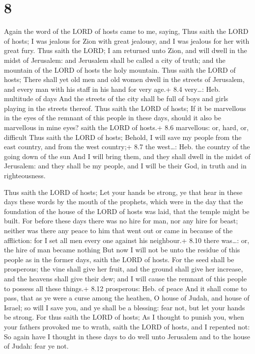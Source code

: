 \hypertarget{section-7}{%
\section{8}\label{section-7}}

 Again the word of the LORD of hosts came to me, saying,
 Thus saith the LORD of hosts; I was jealous for Zion with
great jealousy, and I was jealous for her with great fury. 
Thus saith the LORD; I am returned unto Zion, and will dwell in the
midst of Jerusalem: and Jerusalem shall be called a city of truth; and
the mountain of the LORD of hosts the holy mountain.  Thus
saith the LORD of hosts; There shall yet old men and old women dwell in
the streets of Jerusalem, and every man with his staff in his hand for
very age.+ 8.4 very\ldots: Heb. multitude of days  And the
streets of the city shall be full of boys and girls playing in the
streets thereof.  Thus saith the LORD of hosts; If it be
marvellous in the eyes of the remnant of this people in these days,
should it also be marvellous in mine eyes? saith the LORD of hosts.+ 8.6
marvellous: or, hard, or, difficult  Thus saith the LORD of
hosts; Behold, I will save my people from the east country, and from the
west country;+ 8.7 the west\ldots: Heb. the country of the going down of
the sun  And I will bring them, and they shall dwell in the
midst of Jerusalem: and they shall be my people, and I will be their
God, in truth and in righteousness.

 Thus saith the LORD of hosts; Let your hands be strong,
ye that hear in these days these words by the mouth of the prophets,
which were in the day that the foundation of the house of the LORD of
hosts was laid, that the temple might be built.  For before
these days there was no hire for man, nor any hire for beast; neither
was there any peace to him that went out or came in because of the
affliction: for I set all men every one against his neighbour.+ 8.10
there was\ldots: or, the hire of man became nothing  But
now I will not be unto the residue of this people as in the former days,
saith the LORD of hosts.  For the seed shall be prosperous;
the vine shall give her fruit, and the ground shall give her increase,
and the heavens shall give their dew; and I will cause the remnant of
this people to possess all these things.+ 8.12 prosperous: Heb. of peace
 And it shall come to pass, that as ye were a curse among
the heathen, O house of Judah, and house of Israel; so will I save you,
and ye shall be a blessing: fear not, but let your hands be strong.
 For thus saith the LORD of hosts; As I thought to punish
you, when your fathers provoked me to wrath, saith the LORD of hosts,
and I repented not:  So again have I thought in these days
to do well unto Jerusalem and to the house of Judah: fear ye not.

